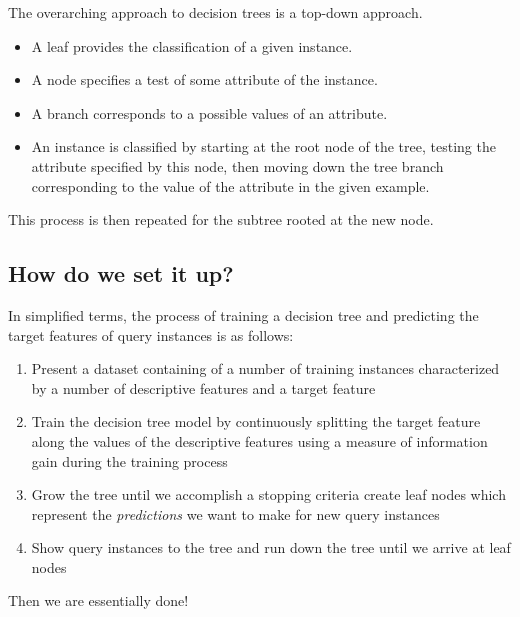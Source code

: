 \documentclass[%
oneside,                 %
final,                   %
10pt]{article}
\begin{document}
The overarching approach to decision trees is a top-down approach.

\begin{itemize}
\item A leaf provides the classification of a given instance.

\item A node specifies a test of some attribute of the instance.

\item A branch corresponds to a possible values of an attribute.

\item An instance is classified by starting at the root node of the tree, testing the attribute specified by this node, then moving down the tree branch corresponding to the value of the attribute in the given example.
\end{itemize}

\noindent
This process is then repeated for the subtree rooted at the new
node.


\subsection*{How do we set it up?}


In simplified terms, the process of training a decision tree and
predicting the target features of query instances is as follows:

\begin{enumerate}
\item Present a dataset containing of a number of training instances characterized by a number of descriptive features and a target feature

\item Train the decision tree model by continuously splitting the target feature along the values of the descriptive features using a measure of information gain during the training process

\item Grow the tree until we accomplish a stopping criteria create leaf nodes which represent the \emph{predictions} we want to make for new query instances

\item Show query instances to the tree and run down the tree until we arrive at leaf nodes
\end{enumerate}

\noindent
Then we are essentially done!
\end{document}
